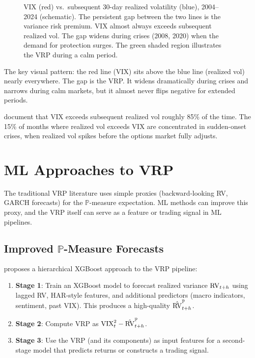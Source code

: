 \begin{figure}[htbp]
\caption{VIX (red) vs.\ subsequent 30-day realized volatility (blue), 2004--2024 (schematic).
The persistent gap between the two lines is the variance risk premium.
VIX almost always exceeds subsequent realized vol.
The gap widens during crises (2008, 2020) when the demand for protection surges.
The green shaded region illustrates the VRP during a calm period.}
\label{fig:vix-vs-rv}
\end{figure}

The key visual pattern: the red line (VIX) sits above the blue line (realized vol) nearly everywhere.
The gap is the VRP.
It widens dramatically during crises and narrows during calm markets, but it almost never flips negative for extended periods.

\citet{Carr2009} document that VIX exceeds subsequent realized vol roughly 85\% of the time.
The 15\% of months where realized vol exceeds VIX are concentrated in sudden-onset crises, when realized vol spikes before the options market fully adjusts.


\section{ML Approaches to VRP}
\label{sec:vrp-ml}

The traditional VRP literature uses simple proxies (backward-looking RV, GARCH forecasts) for the $\mathbb{P}$-measure expectation.
ML methods can improve this proxy, and the VRP itself can serve as a feature or trading signal in ML pipelines.

\subsection{Improved $\mathbb{P}$-Measure Forecasts}

\citet{Fouhy2024} proposes a hierarchical XGBoost approach to the VRP pipeline:
\begin{enumerate}[nosep]
  \item \textbf{Stage 1}: Train an XGBoost model to forecast realized variance $\operatorname{RV}_{t+h}$ using lagged RV, HAR-style features, and additional predictors (macro indicators, sentiment, past VIX). This produces a high-quality $\hat{\operatorname{RV}}^{\mathbb{P}}_{t+h}$.
  \item \textbf{Stage 2}: Compute VRP as $\text{VIX}^2_t - \hat{\operatorname{RV}}^{\mathbb{P}}_{t+h}$.
  \item \textbf{Stage 3}: Use the VRP (and its components) as input features for a second-stage model that predicts returns or constructs a trading signal.
\end{enumerate}

